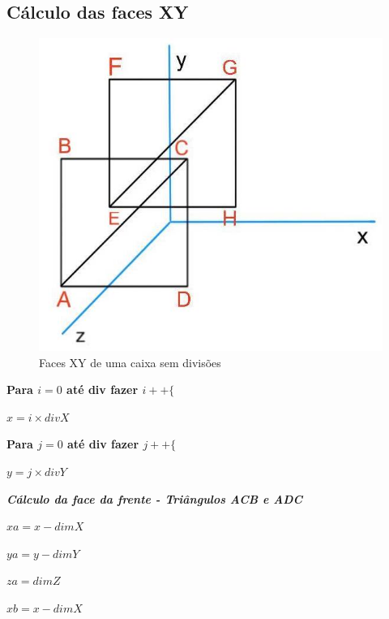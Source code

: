 \documentclass[12pt]{article}
\begin{document}
\subsection{Cálculo das faces XY}
\begin{figure}[H]
\centering\includegraphics[scale=0.45]{XY} 
\caption{\label{fig:controller}Faces XY de uma caixa sem divisões}
\end{figure}
\textbf{Para $ i = 0$ até div fazer $i++\{$} \newline
\par $x = i\times divX$\newline
\par \textbf{Para $ j = 0$ até div fazer $j++\{$} \newline
\par $y = j\times divY$\newline
\par\textit{\textbf{Cálculo da face da frente - Triângulos ACB e ADC}} \newline
\par$xa = x - dimX$ \newline
\par$ya = y-dimY$ \newline
\par$za = dimZ$ \newline\newline
\par$xb = x - dimX$ \newline
\end{document}
